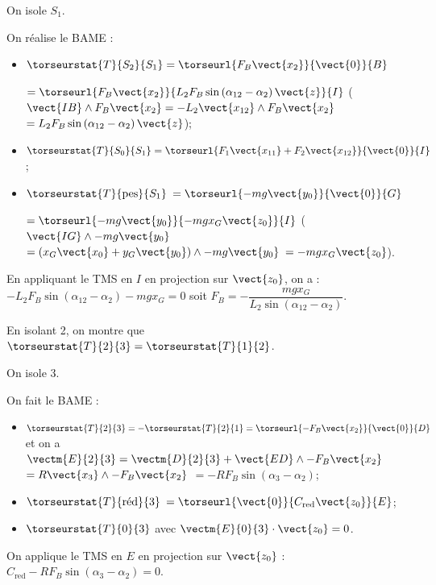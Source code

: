 \ifnormal
{}
\else
\fi

\ifprof
\begin{corrige}
On isole $S_1$. 

On réalise le BAME : 
\begin{itemize}
\item $\torseurstat{T}{S_2}{S_1}=\torseurl{ F_B\vect{x_{2}}}{\vect{0}}{B}$ 

$=\torseurl{ F_B\vect{x_{2}}}{L_2 F_B \sin  \left(\alpha_{12}-\alpha_2\right) \vect{z}}{I}$ ($\vect{IB}\wedge F_B\vect{x_{2}}=-L_2\vect{x_{12}}\wedge  F_B\vect{x_{2}}$ $=L_2 F_B \sin  \left(\alpha_{12}-\alpha_2\right) \vect{z}$);
\item $\torseurstat{T}{S_0}{S_1}=\torseurl{F_1\vect{x_{11}}+F_2\vect{x_{12}}}{\vect{0}}{I}$;
\item $\torseurstat{T}{ \text{pes} }{S_1}$ $=\torseurl{-mg \vect{y_{0}}}{\vect{0}}{G}$

$=\torseurl{-mg \vect{y_{0}}}{-mgx_G\vect{z_{0}}}{I}$ ($\vect{IG}\wedge -mg \vect{y_{0}}$ $=\left(x_G\vect{x_{0}}+y_G\vect{y_{0}} \right) \wedge  -mg \vect{y_{0}}$ $= -mgx_G\vect{z_{0}}$).
\end{itemize}

En appliquant le TMS en $I$ en projection sur $\vect{z_0}$, on a : 
$-L_2 F_B \sin  \left(\alpha_{12}-\alpha_2\right)  -mgx_G = 0 $ soit
$ F_B    = -\dfrac{mgx_G}{L_2  \sin  \left(\alpha_{12}-\alpha_2\right)} $. 
\end{corrige}
\else
\fi

\ifprof
\begin{corrige}
En isolant 2, on montre que $\torseurstat{T}{2}{3}=\torseurstat{T}{1}{2}$. 

On isole 3. 

On fait le BAME :
\begin{itemize}
\item $\torseurstat{T}{2}{3}=-\torseurstat{T}{2}{1}=\torseurl{ -F_B\vect{x_{2}}}{\vect{0}}{D}$ et on a $\vectm{E}{2}{3} = \vectm{D}{2}{3} + \vect{ED}\wedge -F_B\vect{x_{2}}$ $=R\vect{x_3}\wedge -F_B\vect{x_{2}}$ $=-RF_B \sin\left( \alpha_3- \alpha_2\right)$;
\item $\torseurstat{T}{\text{réd}}{3}$ $ = \torseurl{ \vect{0}}{C_{\text{red}}\vect{z_0}}{E}$;
\item $\torseurstat{T}{0}{3}$ avec $\vectm{E}{0}{3}\cdot \vect{z_0} = 0$.
\end{itemize}
On applique le TMS en $E$ en projection sur $\vect{z_0}$ : $C_{\text{red}}-RF_B \sin \left( \alpha_3 - \alpha_2\right) = 0$.
\end{corrige}
\else
\fi

